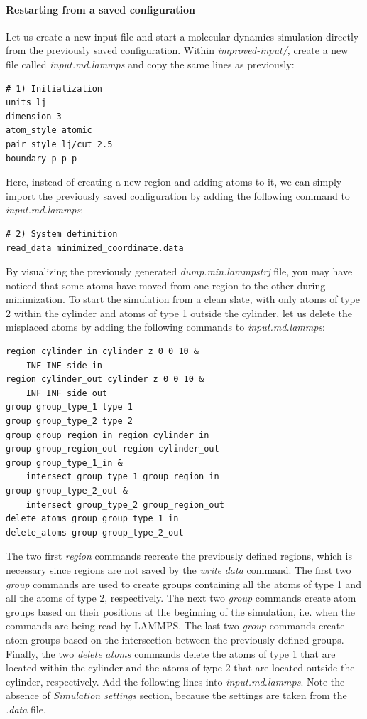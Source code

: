 \documentclass[9pt,tutorial]{livecoms}
\begin{document}
\paragraph{Restarting from a saved configuration}
Let us create a new input file and start a molecular dynamics simulation directly from the previously saved configuration. Within \textit{improved-input/}, create a new file called \textit{input.md.lammps} and copy the same lines as previously:
{\normalsize \begin{verbatim}
# 1) Initialization
units lj
dimension 3
atom_style atomic
pair_style lj/cut 2.5
boundary p p p
\end{verbatim}}
Here, instead of creating a new region and adding atoms to it, we can simply import the previously saved configuration by adding the following command to \textit{input.md.lammps}:
{\normalsize \begin{verbatim}
# 2) System definition
read_data minimized_coordinate.data
\end{verbatim}}
By visualizing the previously generated \textit{dump.min.lammpstrj} file, you may have noticed that some atoms have moved from one region to the other during minimization. To start the simulation from a clean slate, with only atoms of type 2 within the cylinder and atoms of type
1 outside the cylinder, let us delete the misplaced atoms by adding the following commands to \textit{input.md.lammps}:
{\normalsize \begin{verbatim}
region cylinder_in cylinder z 0 0 10 &
    INF INF side in
region cylinder_out cylinder z 0 0 10 &
    INF INF side out
group group_type_1 type 1
group group_type_2 type 2
group group_region_in region cylinder_in
group group_region_out region cylinder_out
group group_type_1_in & 
    intersect group_type_1 group_region_in
group group_type_2_out &
    intersect group_type_2 group_region_out
delete_atoms group group_type_1_in
delete_atoms group group_type_2_out
\end{verbatim}}
The two first \textit{region} commands recreate the previously defined regions, which is necessary since regions are not saved by the \textit{write$\_$data} command. The first two \textit{group} commands are used to create groups containing all the atoms of type 1 and all the atoms of type 2, respectively.
The next two \textit{group} commands create atom groups based on their
positions at the beginning of the simulation, i.e. when the commands are being read by LAMMPS. The last two \textit{group} commands create atom groups based on the intersection between the previously defined groups. Finally, the two \textit{delete$\_$atoms} commands delete the atoms of type 1 that are located within the cylinder and the atoms of type 2 that are located outside the cylinder, respectively. Add the following lines into \textit{input.md.lammps}. Note the absence of \textit{Simulation settings} section, because the settings are taken from the \textit{.data} file.
\end{document}
